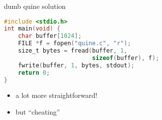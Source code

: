 \begin{frame}[fragile,label=quineDumb]{dumb quine solution}
\begin{lstlisting}[language=C,style=small]
#include <stdio.h>
int main(void) {
    char buffer[1024];
    FILE *f = fopen("quine.c", "r");
    size_t bytes = fread(buffer, 1,
                         sizeof(buffer), f);
    fwrite(buffer, 1, bytes, stdout);
    return 0;
}
\end{lstlisting}
\begin{itemize}
\item a lot more straightforward!
\item but ``cheating''
\end{itemize}
\end{frame}

